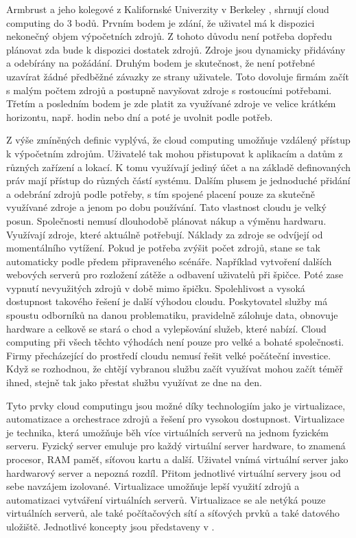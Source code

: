     Armbrust a jeho kolegové z Kalifornské Univerzity v Berkeley \cite{Ambrust2009}, shrnují cloud computing do 3 bodů. Prvním bodem je zdání, že uživatel má k dispozici nekonečný objem výpočetních zdrojů. Z tohoto důvodu není potřeba dopředu plánovat zda bude k dispozici dostatek zdrojů. Zdroje jsou dynamicky přidávány a odebírány na požádání. Druhým bodem je skutečnost, že není potřebné uzavírat žádné předběžné závazky ze strany uživatele. Toto dovoluje firmám začít s malým počtem zdrojů a postupně navyšovat zdroje s rostoucími potřebami. Třetím a posledním bodem je zde platit \linebreak za využívané zdroje ve velice krátkém horizontu, např. hodin nebo dní a poté je uvolnit podle potřeb. \par

    Z výše zmíněných definic vyplývá, že cloud computing umožňuje vzdálený přístup k výpočetním zdrojům. Uživatelé tak mohou přistupovat k aplikacím a datům  \linebreak z různých zařízení a lokací. K tomu využívají jediný účet a na základě definovaných práv mají přístup do různých částí systému. Dalším plusem je jednoduché přidání a odebrání zdrojů podle potřeby, s tím spojené placení pouze za skutečně využívané zdroje a jenom po dobu používání. Tato vlastnost cloudu je velký posun. Společnosti nemusí dlouhodobě plánovat nákup a výměnu hardwaru. Využívají zdroje, které aktuálně potřebují. Náklady za zdroje se odvíjejí od momentálního vytížení. Pokud je potřeba zvýšit počet zdrojů, stane se tak automaticky podle předem připraveného scénáře. Například vytvoření dalších webových serverů pro rozložení zátěže a odbavení uživatelů při špičce. Poté zase vypnutí nevyužitých zdrojů v době mimo špičku.  \linebreak Spolehlivost a vysoká dostupnost takového řešení je další výhodou cloudu. Poskytovatel služby má spoustu odborníků na danou problematiku, pravidelně zálohuje data, obnovuje hardware a celkově se stará o chod a vylepšování služeb, které nabízí. Cloud computing při všech těchto výhodách není pouze pro velké a bohaté společnosti. Firmy přecházející do prostředí cloudu nemusí řešit velké počáteční investice. Když se rozhodnou, že chtějí vybranou službu začít využívat mohou začít téměř ihned, stejně tak jako přestat službu využívat ze dne na den.\par
    Tyto prvky cloud computingu jsou možné díky technologiím jako je virtualizace, automatizace a orchestrace zdrojů a řešení pro vysokou dostupnost. Virtualizace je technika, která umožňuje běh více virtuálních serverů na jednom fyzickém serveru. Fyzický server emuluje pro každý virtuální server hardware, to znamená procesor, RAM paměť, síťovou kartu a další. Uživatel vnímá virtuální server jako hardwarový server a nepozná rozdíl. Přitom jednotlivé virtuální servery jsou od sebe navzájem izolované. Virtualizace umožňuje lepší využití zdrojů a automatizaci vytváření virtuálních serverů. Virtualizace se ale netýká pouze virtuálních serverů, ale také počítačových sítí a síťových prvků a také datového uložiště. Jednotlivé koncepty jsou představeny v  \cite{murphy2017virtualization}. \par
